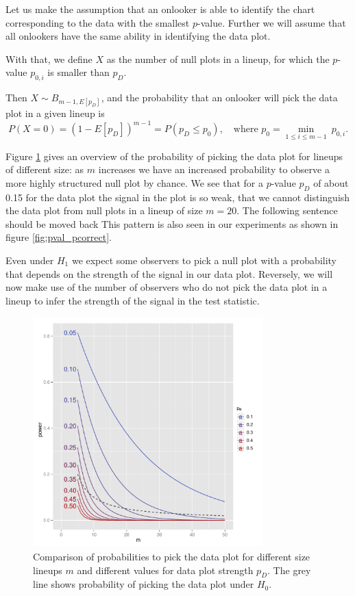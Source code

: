 \documentclass{article}
\newcommand{\red}[1]{{\color{red} #1}} %
\begin{document}
Let us make the assumption that an onlooker is able to identify  the chart corresponding to the data with the smallest $p$-value. Further we will assume that all onlookers  have the same ability in identifying the data plot.

With that, we define $X$  as the number of null plots in a lineup, for which the $p$-value $p_{0,i}$ is smaller than $p_D$.  

Then $X \sim B_{m-1, E[p_D]}$, and the probability that an onlooker will pick the data plot in a given lineup is 
\[
P(X=0) = \left(1 - E[p_D] \right)^{m-1} = P(p_D \le p_0), \ \ \ \text{ where } p_0 = \min_{1 \le i \le m-1}  \ p_{0,i}.
\]




Figure \ref{fig:pval_power} gives an overview of the probability of picking the data plot for lineups of different size: as $m$ increases we have an increased probability to observe a more highly structured null plot by chance. We see that for a $p$-value $p_D$ of about 0.15 for the data plot the signal in the plot is so weak, that we cannot distinguish the data plot from null plots in a lineup of size $m=20$. \red{The following sentence should be moved back} This pattern is also seen in our experiments as shown in figure \ref{fig:pval_pcorrect}.

Even under $H_1$ we expect some observers to pick a null plot with a probability that depends on the strength of the signal in our data plot. 
Reversely, we will now make use of the number of observers who do not pick the data plot in a lineup to infer the strength of the signal in the test statistic.

\begin{figure}[htbp] %
   \centering
   \includegraphics[width=3.5in]{images/powerplot.pdf} 
   \caption{Comparison of probabilities to pick the data plot for different size lineups $m$ and different values for data plot strength $p_D$. The grey line shows probability of picking the data plot under $H_0$. }
   \label{fig:pval_power}
\end{figure}
\end{document}

